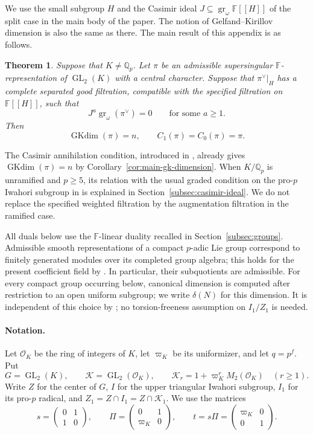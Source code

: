 \documentclass[11pt]{article}
\numberwithin{equation}{section}
\newtheorem{theorem}{Theorem}[section]
\theoremstyle{definition}
\theoremstyle{remark}
\newcommand{\F}{\mathbb F}
\newcommand{\Q}{\mathbb Q}
\newcommand{\cO}{\mathcal O}
\DeclareMathOperator{\GL}{GL}
\DeclareMathOperator{\gr}{gr}
\DeclareMathOperator{\GKdim}{GKdim}
\begin{document}
\begin{cbunit}
We use the small subgroup $H$ and the Casimir ideal
$J\subseteq\gr_\omega\F[[H]]$ of the split case in the main body
of the paper. The notion of Gelfand--Kirillov dimension is also
the same as there. The main result of this appendix is as follows.

\begin{theorem}\label{app:thm-canonical-diagram}
Suppose that $K\ne\Q_p$. Let $\pi$ be an admissible  supersingular  
$\F$-representation of $\GL_2(K)$ with a central character.
{Suppose that $\pi^\vee|_H$ has a complete separated good filtration,
compatible with the specified filtration on $\F[[H]]$}, such that
\[
 J^a\gr_\omega(\pi^\vee)=0
 \qquad\text{for some }a\geq1.
\]
Then
\[
 \GKdim(\pi)=n,\qquad C_1(\pi)=C_0(\pi)=\pi.
\]
\end{theorem}

The Casimir annihilation condition, introduced in \cite{Sor26b}, already
gives $\GKdim(\pi)=n$ by Corollary~\ref{cor:main-gk-dimension}. 
When $K/\Q_p$ is unramified and $p\geq5$, its
relation with the usual graded condition on the pro-$p$ Iwahori subgroup 
in \cite[\S~5.3]{BHH23} is explained in
Section~\ref{subsec:casimir-ideal}. We do not replace the
specified weighted filtration by the augmentation filtration in
the ramified case.\smallskip

All duals below use the $\F$-linear duality recalled in
Section~\ref{subsec:groups}. Admissible
smooth representations of a compact $p$-adic Lie group correspond
to finitely generated modules over its completed group algebra;
this holds for the present coefficient field by
\cite[Prop.~1.9]{Koh17}. In particular,
their subquotients are admissible.
For every compact group occurring below, canonical dimension is
computed after restriction to an open uniform subgroup; we write
$\delta(N)$ for this dimension. It is
independent of this choice by
\cite[Thm.~3.1 and Prop.~3.2]{Koh17}; no torsion-freeness
assumption on $I_1/Z_1$ is needed.\smallskip

\paragraph*{Notation.} Let $\cO_K$ be the ring of integers
of $K$, let $\varpi_K$ be its uniformizer, and let $q=p^f$.
Put
\[
 G=\GL_2(K),\qquad \mathcal K=\GL_2(\cO_K),\qquad
 \mathcal K_r=1+\varpi_K^rM_2(\cO_K)\quad(r\geq1).
\]
Write $Z$ for the center of $G$, $I$ for the upper triangular
Iwahori subgroup, $I_1$ for its pro-$p$ radical, and
$Z_1=Z\cap I_1=Z\cap\mathcal K_1$. We use the matrices
\[
 s=\begin{pmatrix}0&1\\1&0\end{pmatrix},\qquad
 \Pi=\begin{pmatrix}0&1\\\varpi_K&0\end{pmatrix},\qquad
 t=s\Pi=\begin{pmatrix}\varpi_K&0\\0&1\end{pmatrix}.
\]


\end{cbunit}
\end{document}
